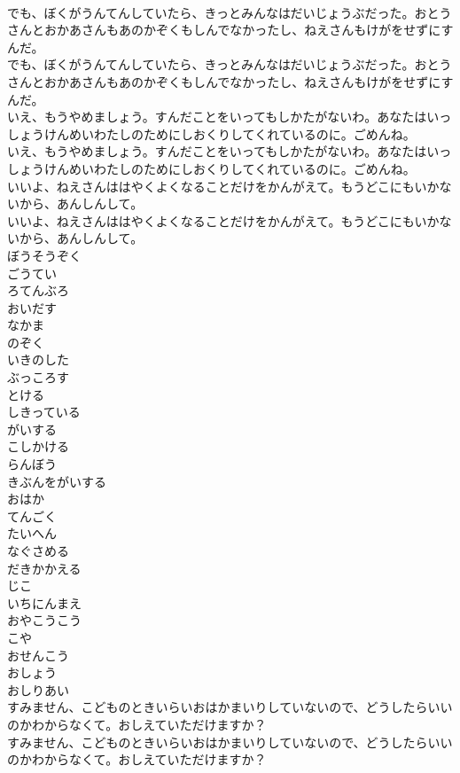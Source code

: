 \documentclass[8pt]{extreport}
\begin{document}
\begin{CJK}{UTF8}{min}
\\	でも、ぼくがうんてんしていたら、きっとみんなはだいじょうぶだった。おとうさんとおかあさんもあのかぞくもしんでなかったし、ねえさんもけがをせずにすんだ。	
\\	でも、ぼくがうんてんしていたら、きっとみんなはだいじょうぶだった。おとうさんとおかあさんもあのかぞくもしんでなかったし、ねえさんもけがをせずにすんだ。 
\\	いえ、もうやめましょう。すんだことをいってもしかたがないわ。あなたはいっしょうけんめいわたしのためにしおくりしてくれているのに。ごめんね。	
\\	いえ、もうやめましょう。すんだことをいってもしかたがないわ。あなたはいっしょうけんめいわたしのためにしおくりしてくれているのに。ごめんね。 
\\	いいよ、ねえさんははやくよくなることだけをかんがえて。もうどこにもいかないから、あんしんして。	
\\	いいよ、ねえさんははやくよくなることだけをかんがえて。もうどこにもいかないから、あんしんして。 
\\	ぼうそうぞく
\\	ごうてい
\\	ろてんぶろ
\\	おいだす
\\	なかま
\\	のぞく
\\	いきのした
\\	ぶっころす
\\	とける
\\	しきっている
\\	がいする
\\	こしかける
\\	らんぼう
\\	きぶんをがいする
\\	おはか
\\	てんごく
\\	たいへん
\\	なぐさめる
\\	だきかかえる
\\	じこ
\\	いちにんまえ
\\	おやこうこう
\\	こや
\\	おせんこう
\\	おしょう
\\	おしりあい
\\	すみません、こどものときいらいおはかまいりしていないので、どうしたらいいのかわからなくて。おしえていただけますか？	
\\	すみません、こどものときいらいおはかまいりしていないので、どうしたらいいのかわからなくて。おしえていただけますか？ 

\end{CJK}
\end{document}
